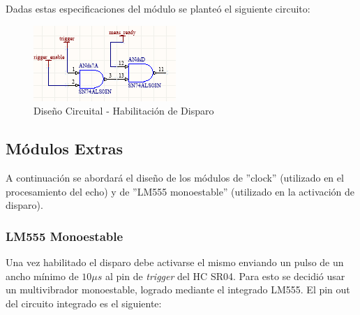 Dadas estas especificaciones del módulo se planteó el siguiente circuito:

\begin{figure}[H]
\begin{centering}
\includegraphics[scale=0.8]{habilitacionDeDisparo.PNG}
\caption{Diseño Circuital - Habilitación de Disparo}
\par\end{centering}
\end{figure}

\subsection{Módulos Extras}

A continuación se abordará el diseño de los módulos de ''clock''
(utilizado en el procesamiento del echo) y de ''LM555 monoestable''
(utilizado en la activación de disparo).

\subsubsection{LM555 Monoestable}

Una vez habilitado el disparo debe activarse el mismo enviando un
pulso de un ancho mínimo de $10\mu s$ al pin de \textit{trigger} del
HC SR04. Para esto se decidió usar un multivibrador monoestable, logrado
mediante el integrado LM555. El pin out del circuito integrado
es el siguiente:


